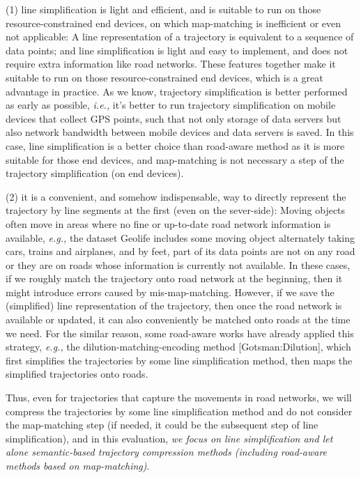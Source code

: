 \documentclass{letter}
\newcommand{\ie}{\emph{i.e.,}\xspace}
\newcommand{\eg}{\emph{e.g.,}\xspace}
\begin{document}
(1) line simplification is light and efficient, and is suitable to run on those resource-constrained end devices, on which map-matching is inefficient or even not applicable: A line representation of a trajectory is equivalent to a sequence of data points; and line simplification is light and easy to implement, and does not require extra information like road networks. These features together make it suitable to run on those resource-constrained end devices, which is a great advantage in practice. As we know, trajectory simplification is better performed as early as possible, \ie it's better to run trajectory simplification on mobile devices that collect GPS points, such that not only storage of data servers but also network bandwidth between mobile devices and data servers is saved. In this case, line simplification is a better choice than road-aware method as it is more suitable for those end devices, and map-matching is not necessary a step of the trajectory simplification (on end devices).

(2) it is a convenient, and somehow indispensable, way to directly represent the trajectory by line segments at the first (even on the sever-side): Moving objects often move in areas where no fine or up-to-date road network information is available, \eg the dataset Geolife includes some moving object alternately taking cars, trains and airplanes, and by feet, part of its data points are not on any road or they are on roads whose information is currently not available. In these cases, if we roughly match the trajectory onto road network at the beginning, then it might introduce errors caused by mis-map-matching. However, if we save the (simplified) line representation of the trajectory, then once the road network is available or updated, it can also conveniently be matched onto roads at the time we need. For the similar reason, some road-aware works have already applied this strategy, \eg the dilution-matching-encoding  method [Gotsman:Dilution], which first simplifies the trajectories by some line simplification method, then maps the simplified trajectories onto roads. 

Thus, even for trajectories that capture the movements in road networks, we will compress the trajectories by some line simplification method and do not consider the map-matching step (if needed, it could be the subsequent step of line simplification), and in this evaluation, \emph{we focus on line simplification and let alone semantic-based trajectory compression methods (including road-aware methods based on map-matching)}.
 
\end{document}
